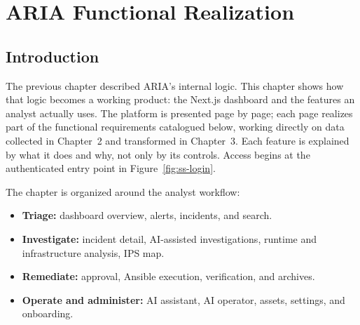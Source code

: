 \chapter{ARIA Functional Realization}

\section{Introduction}

The previous chapter described ARIA's internal logic. This chapter shows how that logic becomes a working product: the Next.js dashboard and the features an analyst actually uses. The platform is presented page by page; each page realizes part of the functional requirements catalogued below, working directly on data collected in Chapter~2 and transformed in Chapter~3. Each feature is explained by what it does and why, not only by its controls. Access begins at the authenticated entry point in Figure~\ref{fig:ss-login}.

The chapter is organized around the analyst workflow:

\begin{itemize}[leftmargin=1cm]
\item \textbf{Triage:} dashboard overview, alerts, incidents, and search.
\item \textbf{Investigate:} incident detail, AI-assisted investigations, runtime and infrastructure analysis, IPS map.
\item \textbf{Remediate:} approval, Ansible execution, verification, and archives.
\item \textbf{Operate and administer:} AI assistant, AI operator, assets, settings, and onboarding.
\end{itemize}


